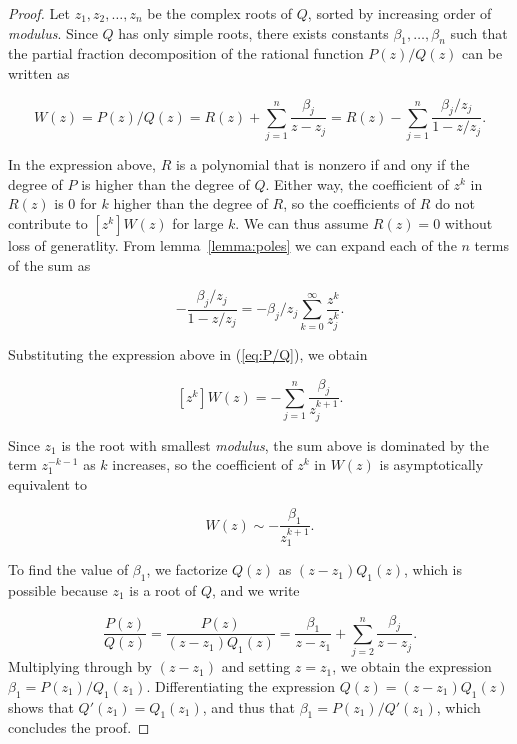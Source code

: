 \documentclass{article}
\begin{document}
\begin{proof}
Let $z_1, z_2, \ldots, z_n$ be the complex roots of $Q$, sorted by
increasing order of \textit{modulus}. Since $Q$ has only simple roots,
there exists constants $\beta_1, \ldots, \beta_n$ such that the partial
fraction decomposition of the rational function $P(z)/Q(z)$ can be written
as

\begin{equation}
\label{eq:P/Q}
W(z) = P(z)/Q(z) = R(z) + \sum_{j=1}^n \frac{\beta_j}{z-z_j} =
R(z) -\sum_{j=1}^n \frac{\beta_j/z_j}{1-z/z_j}.
\end{equation}

In the expression above, $R$ is a polynomial that is nonzero if and ony if
the degree of $P$ is higher than the degree of $Q$. Either way, the
coefficient of $z^k$ in $R(z)$ is $0$ for $k$ higher than the degree of
$R$, so the coefficients of $R$ do not contribute to $[z^k]W(z)$ for
large $k$. We can thus assume $R(z) = 0$ without loss of generatlity. From
lemma~\ref{lemma:poles} we can expand each of the $n$ terms of the sum as

\begin{equation*}
-\frac{\beta_j/z_j}{1-z/z_j} = -\beta_j/z_j
\sum_{k=0}^\infty \frac{z^k}{z_j^k}.
\end{equation*}


Substituting the expression above in (\ref{eq:P/Q}), we obtain

\begin{equation}
\label{eq:fullass}
[z^k]W(z) = -\sum_{j=1}^n \frac{\beta_j}{z_j^{k+1}}.
\end{equation}

Since $z_1$ is the root with smallest \textit{modulus}, the sum above is
dominated by the term $z_1^{-k-1}$ as $k$ increases, so the coefficient
of $z^k$ in $W(z)$ is asymptotically equivalent to

\begin{equation*}
[z^k]W(z) \sim -\frac{\beta_1}{z_1^{k+1}}.
\end{equation*}

To find the value of $\beta_1$, we factorize $Q(z)$ as
$(z-z_1)Q_1(z)$, which is  possible because $z_1$ is a root of $Q$,
and we write

\begin{equation*}
\frac{P(z)}{Q(z)} =
\frac{P(z)}{(z-z_1)Q_1(z)} = \frac{\beta_1}{z-z_1} +
\sum_{j=2}^n\frac{\beta_j}{z-z_j}.
\end{equation*}
Multiplying through by $(z-z_1)$ and setting $z = z_1$, we obtain the
expression $\beta_1 = P(z_1) / Q_1(z_1)$. Differentiating the expression
$Q(z) = (z-z_1)Q_1(z)$ shows that $Q'(z_1) = Q_1(z_1)$, and thus that
$\beta_1 = P(z_1) / Q'(z_1)$, which concludes the proof.
\end{proof}
\end{document}
